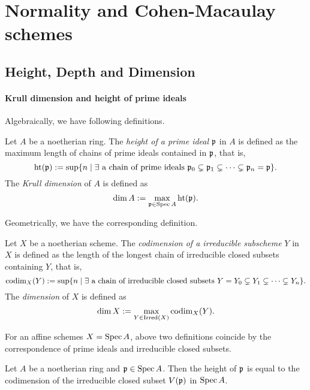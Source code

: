 \section{Normality and Cohen-Macaulay schemes}

\subsection{Height, Depth and Dimension}

    \paragraph{Krull dimension and height of prime ideals}

    Algebraically, we have following definitions.
    \begin{definition}
        Let $A$ be a noetherian ring.
        The \textit{height of a prime ideal} $\mathfrak{p}$ in $A$ is defined as the maximum length of chains of prime ideals contained in $\mathfrak{p}$, that is, 
        \[ \operatorname{ht}(\mathfrak{p}) := \sup\{ n \mid \exists \text{ a chain of prime ideals } \mathfrak{p}_0 \subsetneq \mathfrak{p}_1 \subsetneq \cdots \subsetneq \mathfrak{p}_n = \mathfrak{p}\}. \] 
        The \textit{Krull dimension} of $A$ is defined as 
        \[ \dim A := \max_{\mathfrak{p} \in \operatorname{Spec} A}\operatorname{ht}(\mathfrak{p}). \]
    \end{definition}

    Geometrically, we have the corresponding definition.
    \begin{definition}
        Let $X$ be a noetherian scheme.
        The \textit{codimension of a irreducible subscheme} $Y$ in $X$ is defined as the length of the longest chain of irreducible closed subsets containing $Y$, that is, 
        \[ \operatorname{codim}_X(Y) := \sup\{ n \mid \exists \text{ a chain of irreducible closed subsets } Y = Y_0 \subsetneq Y_1 \subsetneq \cdots \subsetneq Y_n\}. \] 
        The \textit{dimension} of $X$ is defined as
        \[ \dim X := \max_{Y \in \text{Irred}(X)}\operatorname{codim}_X(Y). \]
    \end{definition}

    For an affine schemes $X = \operatorname{Spec} A$, above two definitions coincide by the correspondence of prime ideals and irreducible closed subsets.

    \begin{proposition}
        Let $A$ be a noetherian ring and $\mathfrak{p} \in \operatorname{Spec} A$.
        Then the height of $\mathfrak{p}$ is equal to the codimension of the irreducible closed subset $V(\mathfrak{p})$ in $\operatorname{Spec} A$.
    \end{proposition}

